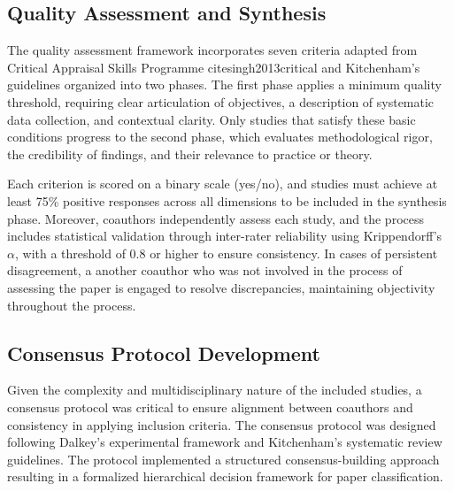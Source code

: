 \documentclass[acmsmall]{acmart}
\begin{document}
\subsection{Quality Assessment and Synthesis}\label{subsec:quality-assessment-and-synthesis}
The quality assessment framework incorporates seven criteria adapted from Critical Appraisal Skills Programme cite{singh2013critical}  and Kitchenham's guidelines organized into two phases. The first phase applies a minimum quality threshold, requiring clear articulation of objectives, a description of systematic data collection, and contextual clarity. Only studies that satisfy these basic conditions progress to the second phase, which evaluates methodological rigor, the credibility of findings, and their relevance to practice or theory.

Each criterion is scored on a binary scale (yes/no), and studies must achieve at least 75\% positive responses across all dimensions to be included in the synthesis phase. Moreover, coauthors independently assess each study, and the process includes statistical validation through inter-rater reliability using Krippendorff’s $\alpha$, with a threshold of $0.8$ or higher to ensure consistency. In cases of persistent disagreement, a another coauthor who was not involved in the process of assessing the paper is engaged to resolve discrepancies, maintaining objectivity throughout the process.

\subsection{Consensus Protocol Development}\label{subsec:consensus-protocol-development}
Given the complexity and multidisciplinary nature of the included studies, a consensus protocol was critical to ensure alignment between coauthors and consistency in applying inclusion criteria.
The consensus protocol was designed following Dalkey's experimental framework \citep{dalkey1963experimental} and Kitchenham's systematic review guidelines. The protocol implemented a structured consensus-building approach resulting in a formalized hierarchical decision framework for paper classification.
\end{document}
